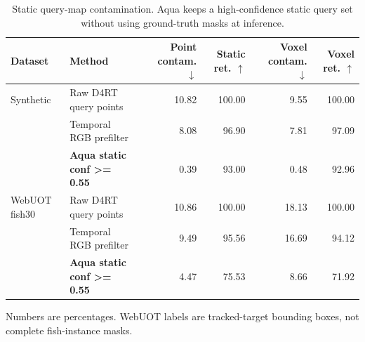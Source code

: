 \begin{table}[t]
\centering
\small
\caption{Static query-map contamination. Aqua keeps a high-confidence static query set without using ground-truth masks at inference.}
\label{tab:aqua_static_query_map}
\begin{tabular}{llrrrr}
\toprule
Dataset & Method & Point contam. $\downarrow$ & Static ret. $\uparrow$ & Voxel contam. $\downarrow$ & Voxel ret. $\uparrow$ \\
\midrule
Synthetic & Raw D4RT query points & 10.82 & 100.00 & 9.55 & 100.00 \\
 & Temporal RGB prefilter & 8.08 & 96.90 & 7.81 & 97.09 \\
 & \textbf{Aqua static conf >= 0.55} & 0.39 & 93.00 & 0.48 & 92.96 \\
WebUOT fish30 & Raw D4RT query points & 10.86 & 100.00 & 18.13 & 100.00 \\
 & Temporal RGB prefilter & 9.49 & 95.56 & 16.69 & 94.12 \\
 & \textbf{Aqua static conf >= 0.55} & 4.47 & 75.53 & 8.66 & 71.92 \\
\bottomrule
\end{tabular}
\vspace{0.25em}
\footnotesize{Numbers are percentages. WebUOT labels are tracked-target bounding boxes, not complete fish-instance masks.}
\end{table}
